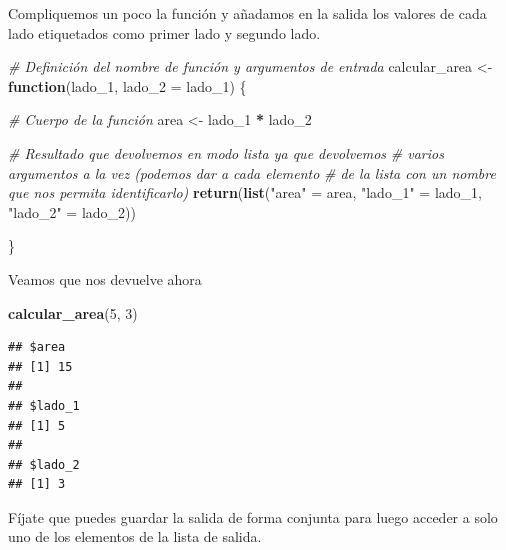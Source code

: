 \documentclass[11pt,]{book}
\newenvironment{Shaded}{\begin{snugshade}}{\end{snugshade}}
\newcommand{\CommentTok}[1]{\textcolor[rgb]{0.37,0.37,0.37}{\textit{#1}}}
\newcommand{\ControlFlowTok}[1]{\textcolor[rgb]{0.27,0.27,0.27}{\textbf{#1}}}
\newcommand{\DataTypeTok}[1]{\textcolor[rgb]{0.27,0.27,0.27}{#1}}
\newcommand{\DecValTok}[1]{\textcolor[rgb]{0.06,0.06,0.06}{#1}}
\newcommand{\KeywordTok}[1]{\textcolor[rgb]{0.27,0.27,0.27}{\textbf{#1}}}
\newcommand{\NormalTok}[1]{#1}
\newcommand{\OperatorTok}[1]{\textcolor[rgb]{0.43,0.43,0.43}{\textbf{#1}}}
\newcommand{\StringTok}[1]{\textcolor[rgb]{0.5,0.5,0.5}{#1}}
\begin{document}
Compliquemos un poco la función y añadamos en la salida los valores de cada lado etiquetados como primer lado y segundo lado.

\begin{Shaded}
\begin{Highlighting}[]
\CommentTok{# Definición del nombre de función y argumentos de entrada}
\NormalTok{calcular_area <-}\StringTok{ }\ControlFlowTok{function}\NormalTok{(lado_}\DecValTok{1}\NormalTok{, }\DataTypeTok{lado_2 =}\NormalTok{ lado_}\DecValTok{1}\NormalTok{) \{}
  
  \CommentTok{# Cuerpo de la función}
\NormalTok{  area <-}\StringTok{ }\NormalTok{lado_}\DecValTok{1} \OperatorTok{*}\StringTok{ }\NormalTok{lado_}\DecValTok{2}
  
  \CommentTok{# Resultado que devolvemos en modo lista ya que devolvemos}
  \CommentTok{# varios argumentos a la vez (podemos dar a cada elemento }
  \CommentTok{# de la lista con un nombre que nos permita identificarlo)}
  \KeywordTok{return}\NormalTok{(}\KeywordTok{list}\NormalTok{(}\StringTok{"area"}\NormalTok{ =}\StringTok{ }\NormalTok{area, }\StringTok{"lado_1"}\NormalTok{ =}\StringTok{ }\NormalTok{lado_}\DecValTok{1}\NormalTok{, }\StringTok{"lado_2"}\NormalTok{ =}\StringTok{ }\NormalTok{lado_}\DecValTok{2}\NormalTok{))}
  
\NormalTok{\}}
\end{Highlighting}
\end{Shaded}

Veamos que nos devuelve ahora

\begin{Shaded}
\begin{Highlighting}[]
\KeywordTok{calcular_area}\NormalTok{(}\DecValTok{5}\NormalTok{, }\DecValTok{3}\NormalTok{)}
\end{Highlighting}
\end{Shaded}

\begin{verbatim}
## $area
## [1] 15
## 
## $lado_1
## [1] 5
## 
## $lado_2
## [1] 3
\end{verbatim}

Fíjate que puedes guardar la salida de forma conjunta para luego acceder a solo uno de los elementos de la lista de salida.

\begin{Shaded}
\end{Shaded}
\end{document}
